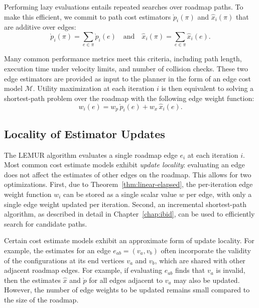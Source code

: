 Performing lazy evaluations entails repeated searches over
roadmap paths.
To make this efficient,
we commit to path cost estimators
$\grave{p}_i(\pi)$ and $\hat{x}_i(\pi)$
that are additive over edges:
\begin{equation}
   \grave{p}_i(\pi) = \sum_{e \in \pi} \grave{p}_i(e)
   \quad\mbox{and}\quad
   \hat{x}_i(\pi) = \sum_{e \in \pi} \hat{x}_i(e).
\end{equation}

Many common performance metrics meet this criteria,
including path length, execution time under velocity limits,
and number of collision checks.
These two edge estimators are provided as input to the planner
in the form of an edge cost model $\mathcal{M}$.
Utility maximization at each iteration $i$ is then
equivalent to solving
a shortest-path problem over the roadmap with the following
edge weight function:
\begin{equation}
   w_i(e) = w_p \, \grave{p}_i(e) + w_x \, \hat{x}_i(e).
   \label{eqn:edge-weight}
\end{equation}

\subsection{Locality of Estimator Updates}

The LEMUR algorithm evaluates a single roadmap edge $e_i$
at each iteration $i$.
Most common cost estimate models exhibit \emph{update locality}:
evaluating an edge does not affect the estimates of other edges
on the roadmap.
This allows for two optimizations.
First,
due to Theorem~\ref{thm:linear-elapsed},
the per-iteration edge weight function $w_i$
can be stored as a single scalar value $w$ per edge,
with only a single edge weight updated per iteration.
Second,
an incremental shortest-path algorithm,
as described in detail in Chapter~\ref{chap:ibid},
can be used to efficiently search for candidate paths.

Certain cost estimate models exhibit an approximate form of
update locality.
For example, the estimates for an edge $e_{ab} = (v_a, v_b)$
often incorporate the validity of the configurations
at its end vertices $v_a$ and $v_b$,
which are shared with other adjacent roadmap edges.
For example, if evaluating $e_{ab}$ finds that $v_a$ is invalid,
then the estimates $\hat{x}$ and $\grave{p}$ for all edges
adjacent to $v_a$ may also be updated.
However,
the number of edge weights to be updated remains small
compared to the size of the roadmap.

